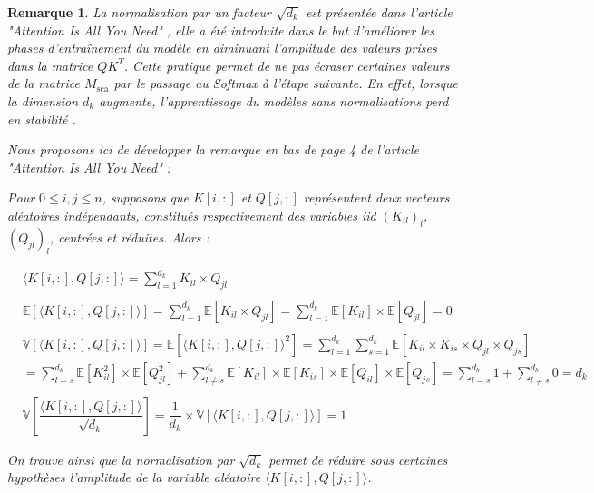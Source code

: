 \documentclass[12pt]{article}
\newtheorem{rmq}{Remarque}
\theoremstyle{definition}
\begin{document}
\begin{rmq}
	La normalisation par un facteur \(\sqrt{d_k}\) est présentée dans l'article \textit{"Attention Is All You Need}" \cite{a_i_a_y_n}, elle a été introduite dans le but d'améliorer les phases d'entraînement du modèle en diminuant l'amplitude des valeurs prises dans la matrice \(QK^T\). Cette pratique permet de ne pas écraser certaines valeurs de la matrice \(M_{\text{sca}}\) par le passage au Softmax à l'étape suivante. En effet, lorsque la dimension $d_k$ augmente, l'apprentissage du modèles sans normalisations perd en stabilité \cite{a_i_a_y_n}. 
	
	Nous proposons ici de développer la remarque en bas de page 4 de l'article \textit{"Attention Is All You Need}" \cite{a_i_a_y_n} : 
	
	Pour $0\leq i,j \leq n$, supposons que $K[i,:]$ et $Q[j,:]$ représentent deux vecteurs aléatoires indépendants, constitués respectivement des variables iid $(K_{il})_l$, $(Q_{jl})_l$, centrées et réduites. Alors : 
	

	\begin{align*}
		&\langle K[i,:] , Q[j,:]\rangle = \sum_{l=1}^{d_k} K_{il} \times Q_{jl}\\\\
		&\mathbb{E}\left[\langle K[i,:] , Q[j,:]\rangle\right] = \sum_{l=1}^{d_k} \mathbb{E}\left[K_{il} \times Q_{jl}\right] = \sum_{l=1}^{d_k} \mathbb{E}\left[K_{il} \right] \times \mathbb{E}\left[ Q_{jl}\right] = 0\\\\
		&\mathbb{V}\left[\langle K[i,:] , Q[j,:]\rangle\right] = \mathbb{E}\left[\langle K[i,:] , Q[j,:]\rangle^2\right] = \sum_{l=1}^{d_k}\sum_{s=1}^{d_k} \mathbb{E}\left[K_{il} \times K_{is} \times Q_{jl}\times Q_{js}\right] \\
		& = \sum_{l=s}^{d_k} \mathbb{E}\left[K_{il}^2 \right] \times \mathbb{E}\left[ Q_{jl}^2\right] +  \sum_{l\neq s}^{d_k} \mathbb{E}\left[K_{il}\right] \times \mathbb{E}\left[K_{is}\right]\times \mathbb{E}\left[Q_{il}\right]\times \mathbb{E}\left[ Q_{js}\right] = \sum_{l=s}^{d_k} 1 +  \sum_{l\neq s}^{d_k} 0 = d_k\\ \\
		&\mathbb{V}\left[\dfrac{\langle K[i,:] , Q[j,:]\rangle}{\sqrt{d_k}}\right] = \dfrac{1}{d_k} \times \mathbb{V}\left[\langle K[i,:] , Q[j,:]\rangle\right] = 1
	\end{align*}


On trouve ainsi que la normalisation par $\sqrt{d_k}$ permet de réduire sous certaines hypothèses l'amplitude de la variable aléatoire $\langle K[i,:] , Q[j,:]\rangle$. \\[1cm]


\end{rmq}
\end{document}
